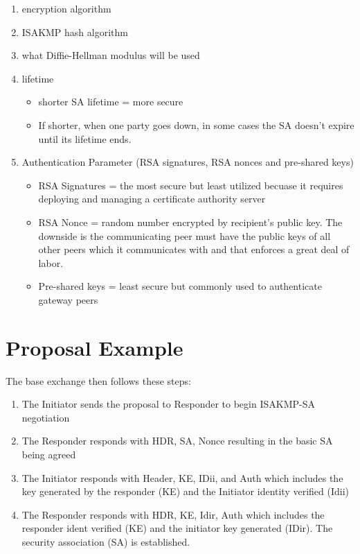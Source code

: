\documentclass{report}
\newcommand{\squash}{\itemsep=0pt\parskip=0pt}
\begin{document}
\begin{itemize}
\begin{enumerate}
  \squash
\item encryption algorithm
\item ISAKMP hash algorithm
\item what Diffie-Hellman modulus will be used
\item lifetime
  \begin{itemize}
  \item shorter SA lifetime = more secure
  \item If shorter, when one party goes down, in some cases the SA doesn't expire until its lifetime ends.
  \end{itemize}
\item Authentication Parameter (RSA signatures, RSA nonces and pre-shared keys)
  \begin{itemize}
  \item RSA Signatures = the most secure but least utilized becuase it requires deploying and managing a certificate authority server
  \item RSA Nonce = random number encrypted by recipient's public key. The downside is the communicating peer must have the public keys of all other peers which it communicates with and that enforces a great deal of labor.
    \item Pre-shared keys = least secure but commonly used to authenticate gateway peers
  \end{itemize}
\end{enumerate}


\section {Proposal Example}


The base exchange then follows these steps:

\begin{enumerate}
\squash
\item The Initiator sends the proposal to Responder to begin ISAKMP-SA negotiation
\item The Responder responds with HDR, SA, Nonce resulting in the basic SA being agreed 
\item The Initiator responds with Header, KE, IDii, and Auth which includes the key generated by the responder (KE) and the Initiator identity verified (Idii)
\item The Responder responds with HDR, KE, Idir, Auth which includes the responder ident verified (KE) and the initiator key generated (IDir). The security association (SA) is established. 
\end{enumerate}


\end{itemize}
\end{document}
